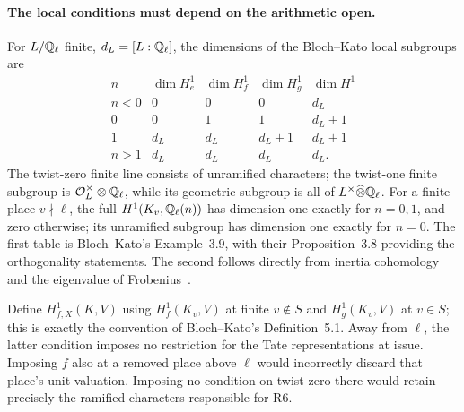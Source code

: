 \paragraph{The local conditions must depend on the arithmetic open.}
For \(L/\mathbb Q_\ell\) finite, \(d_L=[L:\mathbb Q_\ell]\), the dimensions of
the Bloch--Kato local subgroups are
\[
\begin{array}{c|rrrr}
 n&\dim H^1_e&\dim H^1_f&\dim H^1_g&\dim H^1\\ \hline
n<0&0&0&0&d_L\\
0&0&1&1&d_L+1\\
1&d_L&d_L&d_L+1&d_L+1\\
n>1&d_L&d_L&d_L&d_L .
\end{array}\tag{B.14}
\]
The twist-zero finite line consists of unramified characters; the
twist-one finite subgroup is \(\mathcal O_L^\times\otimes\mathbb Q_\ell\),
while its geometric subgroup is all of
\(L^\times\widehat\otimes\mathbb Q_\ell\).  For a finite place
\(v\nmid\ell\), the full \(H^1(K_v,\mathbb Q_\ell(n))\) has dimension
one exactly for \(n=0,1\), and zero otherwise; its unramified subgroup
has dimension one exactly for \(n=0\).  The first table is
Bloch--Kato's Example~3.9, with their Proposition~3.8 providing the
orthogonality statements.  The second follows directly from inertia
cohomology and the eigenvalue of Frobenius~\cite[Proposition~3.8,
Example~3.9]{BBlochKato1990}.

Define \(H^1_{f,X}(K,V)\) using \(H^1_f(K_v,V)\) at finite
\(v\notin S\) and \(H^1_g(K_v,V)\) at \(v\in S\); this is
exactly the convention of Bloch--Kato's Definition~5.1.  Away from
\(\ell\), the latter condition imposes no restriction for the Tate
representations at issue.  Imposing \(f\) also at a removed place
above \(\ell\) would incorrectly discard that place's unit valuation.
Imposing no condition on twist zero there would retain precisely the
ramified characters responsible for R6.

